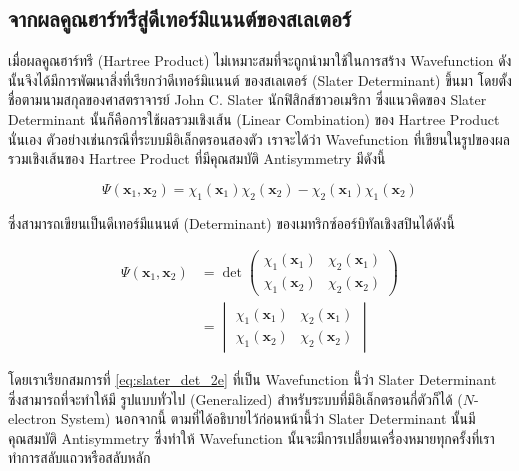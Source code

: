 \subsection{จากผลคูณฮาร์ทรีสู่ดีเทอร์มิแนนต์ของสเลเตอร์}
\label{ssec:hartree_prod_to_slater_deter}

เมื่อผลคูณฮาร์ทรี (Hartree Product) ไม่เหมาะสมที่จะถูกนำมาใช้ในการสร้าง Wavefunction ดังนั้นจึงได้มีการพัฒนาสิ่งที่เรียกว่าดีเทอร์มิแนนต์%
ของสเลเตอร์ (Slater Determinant) ขึ้นมา โดยตั้งชื่อตามนามสกุลของศาสตราจารย์ John C. Slater นักฟิสิกส์ชาวอเมริกา ซึ่งแนวคิดของ
Slater Determinant นั้นก็คือการใช้ผลรวมเชิงเส้น (Linear Combination) ของ Hartree Product นั่นเอง\autocite{slater1929}
ตัวอย่างเช่นกรณีที่ระบบมีอิเล็กตรอนสองตัว เราจะได้ว่า Wavefunction ที่เขียนในรูปของผลรวมเชิงเส้นของ Hartree Product ที่มีคุณสมบัติ
Antisymmetry มีดังนี้

\begin{equation}\label{eq:lin_com_hartree_prod}
    \Psi(\bm{x}_{1}, \bm{x}_{2}) = \chi_{1}(\bm{x}_{1})\chi_{2}(\bm{x}_{2}) -
    \chi_{2}(\bm{x}_{1})\chi_{1}(\bm{x}_{2})
\end{equation}

\noindent ซึ่งสามารถเขียนเป็นดีเทอร์มีแนนต์ (Determinant) ของเมทริกซ์ออร์บิทัลเชิงสปินได้ดังนี้

\begin{align}\label{eq:slater_det_2e}
    \Psi(\bm{x}_{1}, \bm{x}_{2}) & =
    \det \begin{pmatrix}
             \chi_{1}(\bm{x}_{1}) & \chi_{2}(\bm{x}_{1}) \\
             \chi_{1}(\bm{x}_{2}) & \chi_{2}(\bm{x}_{2})
         \end{pmatrix} \nonumber                             \\
                                 & = \begin{vmatrix}
                                         \chi_{1}(\bm{x}_{1}) & \chi_{2}(\bm{x}_{1}) \\
                                         \chi_{1}(\bm{x}_{2}) & \chi_{2}(\bm{x}_{2})
                                     \end{vmatrix}
\end{align}

\noindent โดยเราเรียกสมการที่ \eqref{eq:slater_det_2e} ที่เป็น Wavefunction นี้ว่า Slater Determinant ซึ่งสามารถที่จะทำให้มี%
รูปแบบทั่วไป (Generalized) สำหรับระบบที่มีอิเล็กตรอนกี่ตัวก็ได้ ($N$-electron System) นอกจากนี้ ตามที่ได้อธิบายไว้ก่อนหน้านี้ว่า Slater
Determinant นั้นมีคุณสมบัติ Antisymmetry ซึ่งทำให้ Wavefunction นั้นจะมีการเปลี่ยนเครื่องหมายทุกครั้งที่เราทำการสลับแถวหรือสลับหลัก


